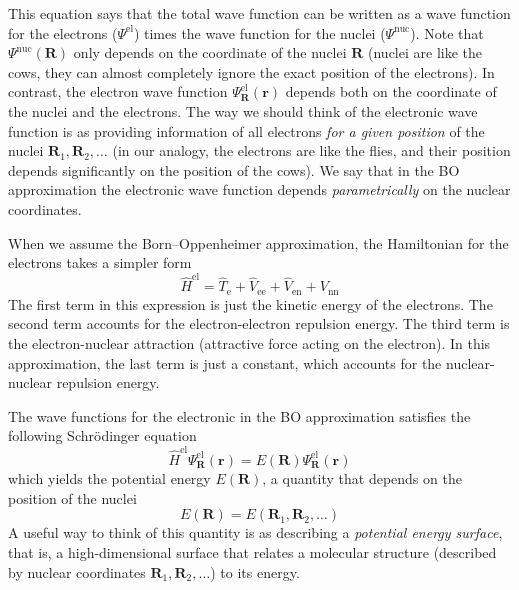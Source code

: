 \documentclass[../Main/chem371-notes.tex]{subfiles}
\begin{document}
This equation says that the total wave function can be written as a wave function for the electrons ($\Psi^\mathrm{el}$) times the wave function for the nuclei ($\Psi^\mathrm{nuc}$).
Note that $\Psi^\mathrm{nuc}(\mathbf{R} )$ only depends on the coordinate of the nuclei $\mathbf{R}$ (nuclei are like the cows, they can almost completely ignore the exact position of the electrons).
In contrast, the electron wave function $\Psi_{\mathbf{R}}^\mathrm{el}(\mathbf{r})$ depends both on the coordinate of the nuclei and the electrons.
The way we should think of the electronic wave function is as providing information of all electrons \emph{for a given position} of the nuclei $ \mathbf{R}_1,  \mathbf{R}_2,\ldots$ (in our analogy, the electrons are like the flies, and their position depends significantly on the position of the cows).
We say that in the BO approximation the electronic wave function depends \emph{parametrically} on the nuclear coordinates.

When we assume the Born--Oppenheimer approximation, the Hamiltonian for the electrons takes a simpler form
\begin{equation}
\hat{H}^\mathrm{el} = \hat{T}_\mathrm{e} + \hat{V}_\mathrm{ee} + \hat{V}_\mathrm{en} + V_\mathrm{nn}
\end{equation}
The first term in this expression is just the kinetic energy of the electrons. The second term accounts for the electron-electron repulsion energy. The third term is the electron-nuclear attraction (attractive force acting on the electron). In this approximation, the last term is just a constant, which accounts for the nuclear-nuclear repulsion energy.

The wave functions for the electronic in the BO approximation satisfies the following Schr\"{o}dinger equation
\begin{equation}
\label{eq:electronic_SE}
\hat{H}^\mathrm{el}\Psi_{\mathbf{R}}^\mathrm{el}(\mathbf{r}) =
E(\mathbf{R})
\Psi_{\mathbf{R}}^\mathrm{el}(\mathbf{r})
\end{equation}
which yields the potential energy $E(\mathbf{R})$, a quantity that depends on the position of the nuclei
\begin{equation}
E(\mathbf{R})= E(\mathbf{R}_1,  \mathbf{R}_2,\ldots)
\end{equation}
A useful way to think of this quantity is as describing a \emph{potential energy surface}, that is, a high-dimensional surface that relates a molecular structure (described by nuclear coordinates $\mathbf{R}_1,  \mathbf{R}_2,\ldots$) to its energy.
\end{document}
